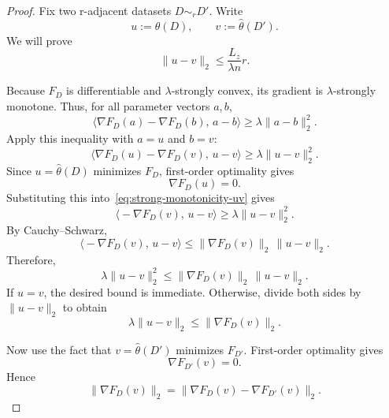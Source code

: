 \documentclass[conference,compsoc]{IEEEtran}
\begin{document}
\begin{proof}
Fix two r-adjacent datasets $D\sim_r D'$. Write
\[
u:=\hat\theta(D),
\qquad
v:=\hat\theta(D').
\]
We will prove
\[
\|u-v\|_2\le \frac{L_z}{\lambda n}r.
\]

Because $F_D$ is differentiable and $\lambda$-strongly convex, its gradient is $\lambda$-strongly monotone. Thus, for all parameter vectors $a,b$,
\[
\big\langle \nabla F_D(a)-\nabla F_D(b),\,a-b\big\rangle
\ge
\lambda\|a-b\|_2^2.
\]
Apply this inequality with $a=u$ and $b=v$:
\begin{equation}
\label{eq:strong-monotonicity-uv}
\big\langle \nabla F_D(u)-\nabla F_D(v),\,u-v\big\rangle
\ge
\lambda\|u-v\|_2^2.
\end{equation}
Since $u=\hat\theta(D)$ minimizes $F_D$, first-order optimality gives
\[
\nabla F_D(u)=0.
\]
Substituting this into~\eqref{eq:strong-monotonicity-uv} gives
\[
\big\langle -\nabla F_D(v),\,u-v\big\rangle
\ge
\lambda\|u-v\|_2^2.
\]
By Cauchy--Schwarz,
\[
\big\langle -\nabla F_D(v),\,u-v\big\rangle
\le
\|\nabla F_D(v)\|_2\,\|u-v\|_2.
\]
Therefore,
\[
\lambda\|u-v\|_2^2
\le
\|\nabla F_D(v)\|_2\,\|u-v\|_2.
\]
If $u=v$, the desired bound is immediate. Otherwise, divide both sides by $\|u-v\|_2$ to obtain
\begin{equation}
\label{eq:distance-controlled-by-gradient}
\lambda\|u-v\|_2
\le
\|\nabla F_D(v)\|_2.
\end{equation}

Now use the fact that $v=\hat\theta(D')$ minimizes $F_{D'}$. First-order optimality gives
\[
\nabla F_{D'}(v)=0.
\]
Hence
\begin{equation}
\label{eq:gradient-rewrite}
\|\nabla F_D(v)\|_2
=
\|\nabla F_D(v)-\nabla F_{D'}(v)\|_2.
\end{equation}


\end{proof}
\end{document}
